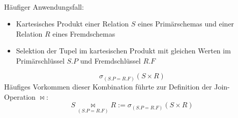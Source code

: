 \begin{frame}\frametitle{\insertsection}
\framesubtitle{\insertsubsection}
\\[8pt]
H\"aufiger Anwendungsfall: 
\begin{itemize}
	\item Kartesisches Produkt einer Relation $S$ eines Prim\"arschemas und einer Relation $R$ eines Fremdschemas
	\item Selektion der Tupel im kartesischen Produkt mit gleichen Werten im Prim\"arschl\"ussel $S.P$ und Fremdschl\"ussel $R.F$
\end{itemize}
\begin{equation*}
\sigma_{(S.P=R.F)}(S\times R)
\end{equation*}
\abs
H\"aufiges Vorkommen dieser Kombination f\"uhrte zur Definition der Join-Operation $\Join$:
\begin{equation*}
S \underset{(S.P = R.F)}{\Join} R := \sigma_{(S.P=R.F)}(S\times R)
\end{equation*}
\end{frame}

